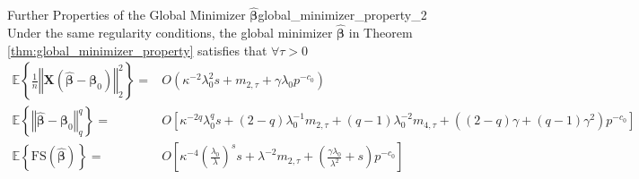 \documentclass[twoside]{article}
\begin{document}
\begin{theorem}{Further Properties of the Global Minimizer $\hat{\boldsymbol{\beta}}$}{global_minimizer_property_2}
    Under the same regularity conditions, the global minimizer $\hat{\boldsymbol{\beta}}$ in Theorem \ref{thm:global_minimizer_property} satisfies that $\forall \tau >0$
    \begin{align}
        \mathbb{E}\left\{ \frac{1}{n}\left\Vert \mathbf{X}\left( \hat{\boldsymbol{\beta}} -\boldsymbol{\beta}_0 \right) \right\Vert^2 _2 \right\} =& O\left(\kappa^{-2}\lambda^2_0s +m_{2,\tau}+\gamma \lambda_0p^{-c_0}\right) \\
        \mathbb{E}\left\{ \left\Vert \hat{\boldsymbol{\beta}}-\boldsymbol{\beta}_0 \right\Vert^q _q \right\} = &O\left[ \kappa^{-2q}\lambda_0^q s + (2-q)\lambda_0^{-1}m_{2,\tau}+(q-1)\lambda^{-2}_0m_{4,\tau} + \left( (2-q)\gamma + (q-1)\gamma^2 \right)p^{-c_0} \right] \\
        \mathbb{E}\left\{\mathrm{FS}\left(\hat{\boldsymbol{\beta}} \right) \right\} =& O\left[ \kappa^{-4}\left( \frac{\lambda_0}{\lambda} \right)^s s +\lambda^{-2}m_{2,\tau} + \left(\frac{\gamma\lambda_0}{\lambda^2}+s\right)p^{-c_0} \right]
    \end{align}
\end{theorem}

\newpage


\end{document}
